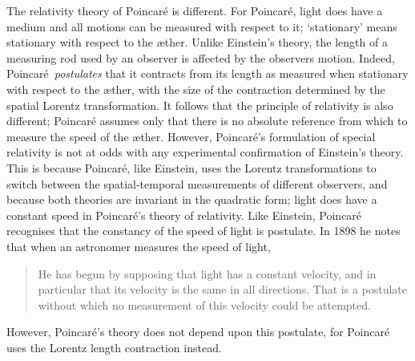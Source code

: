 \documentclass[10pt, fleqn,final,showtrims,oldfontcommands, article,a4paper,oneside]{memoir} %
\newcommand{\aether}{\ae ther}
\newcommand{\Poincare}{Poincar{\'e}\xspace}
\begin{document}
The relativity theory of \Poincare is different.
For \Poincare, light does have a medium and all motions can be  measured with respect to it;
`stationary' means stationary with respect to the \aether\cite{Poincare1908,PoincareScienceAndMethod,Pierseaux2005}.
Unlike Einstein's theory, the length of a measuring rod used by an observer is affected by the observers motion.
Indeed, \Poincare\ {\em postulates} that it contracts from its  length as measured when stationary with respect to the \aether,
with the size of the contraction  determined by the spatial Lorentz transformation\cite{Poincare1906, Pierseaux2005}.
It follows that the principle of relativity  is also different;
\Poincare assumes only that there is no absolute reference from  which to measure the speed of the \aether\cite{Poincare1906}.
However, \Poincare's formulation of special relativity is not at odds with any experimental confirmation of Einstein's theory\cite{Pierseaux2001}.
This is because \Poincare, like Einstein, uses the Lorentz transformations to switch between the spatial-temporal measurements of different observers,
and because both theories are invariant in  the quadratic form;
light does have a constant speed in  \Poincare's theory of relativity\cite{Pierseaux2001}.
Like Einstein, \Poincare recognises that the constancy of the speed of light is postulate.
In 1898\cite{Poincare1898} he notes that when an astronomer measures the speed of light, 
\begin{quote}
  He has begun by supposing that light has a constant velocity, 
  and in particular that its velocity is the same in all directions. 
  That is a postulate without which no measurement of this velocity could be attempted. 
\end{quote}
However, \Poincare's  theory does not depend upon this postulate,
for \Poincare uses the Lorentz length contraction instead\cite{Pierseaux2005}.
\end{document}

